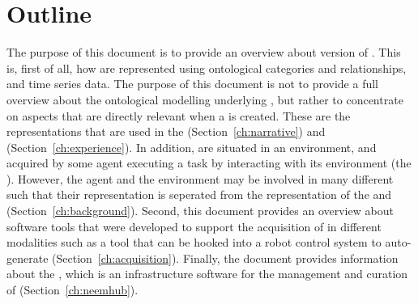 \lipsum[4]

\lipsum[4]

\section{Outline} %
The purpose of this document is to provide an overview about version \neemversion of \neems.
This is, first of all, how \neems are represented using ontological categories and relationships, and time series data.
The purpose of this document is not to provide a full overview about the ontological modelling underlying \neems, but rather to concentrate on aspects that are directly relevant when a \neem is created.
These are the representations that are used in the \neemnar (Section~\ref{ch:narrative}) and \neemexp (Section~\ref{ch:experience}).
In addition, \neems are situated in an environment, and acquired by some agent executing a task by interacting with its environment (the \neembak).
However, the agent and the environment may be involved in many different \neems such that their representation is seperated from the representation of the \neemnar and \neemexp (Section~\ref{ch:background}).
Second, this document provides an overview about software tools that were developed to support the acquisition of \neems in different modalities such as a tool that can be hooked into a robot control system to auto-generate \neems (Section~\ref{ch:acquisition}).
Finally, the document provides information about the \neemhub, which is an infrastructure software for the management and curation of \neems (Section~\ref{ch:neemhub}).


